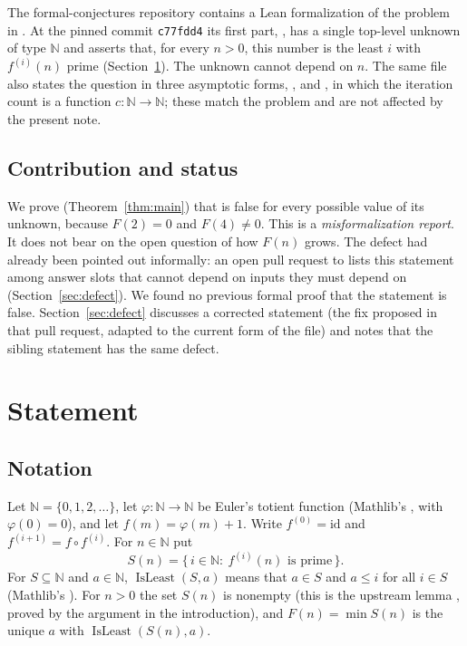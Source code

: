 \documentclass[11pt]{amsart}
\theoremstyle{plain}
\theoremstyle{definition}
\newcommand{\N}{\mathbb{N}}
\DeclareMathOperator{\IsLeast}{IsLeast}
\begin{document}
The formal-conjectures repository \cite{FC} contains a Lean formalization of the problem in . At the pinned commit \texttt{c77fdd4} its first part, , has a single top-level unknown  of type $\N$ and asserts that, for every $n>0$, this number is the least $i$ with $f^{(i)}(n)$ prime (Section~\ref{sec:statement}). The unknown cannot depend on $n$. The same file also states the question in three asymptotic forms, ,  and , in which the iteration count is a function $c\colon\N\to\N$; these match the problem and are not affected by the present note.

\subsection*{Contribution and status}
We prove (Theorem~\ref{thm:main}) that  is false for every possible value of its unknown, because $F(2)=0$ and $F(4)\ne 0$. This is a \emph{misformalization report}. It does not bear on the open question of how $F(n)$ grows. The defect had already been pointed out informally: an open pull request to \cite{FC} lists this statement among answer slots that cannot depend on inputs they must depend on (Section~\ref{sec:defect}). We found no previous formal proof that the statement is false. Section~\ref{sec:defect} discusses a corrected statement (the fix proposed in that pull request, adapted to the current form of the file) and notes that the sibling statement  has the same defect.

\section{Statement}\label{sec:statement}

\subsection{Notation}
Let $\N=\{0,1,2,\dots\}$, let $\varphi\colon\N\to\N$ be Euler's totient function (Mathlib's , with $\varphi(0)=0$), and let $f(m)=\varphi(m)+1$. Write $f^{(0)}=\mathrm{id}$ and $f^{(i+1)}=f\circ f^{(i)}$. For $n\in\N$ put
\[
S(n)=\{\,i\in\N:\ f^{(i)}(n)\text{ is prime}\,\}.
\]
For $S\subseteq\N$ and $a\in\N$, $\IsLeast(S,a)$ means that $a\in S$ and $a\le i$ for all $i\in S$ (Mathlib's ). For $n>0$ the set $S(n)$ is nonempty (this is the upstream lemma , proved by the argument in the introduction), and $F(n)=\min S(n)$ is the unique $a$ with $\IsLeast(S(n),a)$.
\end{document}
